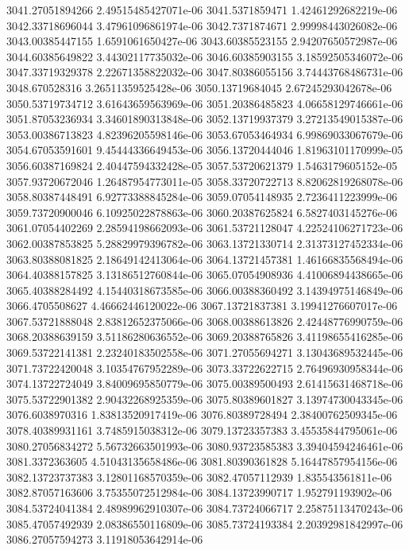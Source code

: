 {3041.27051894266 2.49515485427071e-06
3041.5371859471 1.42461292682219e-06
3042.33718696044 3.47961096861974e-06
3042.7371874671 2.99998443026082e-06
3043.00385447155 1.6591061650427e-06
3043.60385523155 2.94207650572987e-06
3044.60385649822 3.44302117735032e-06
3046.60385903155 3.18592505346072e-06
3047.33719329378 2.22671358822032e-06
3047.80386055156 3.74443768486731e-06
3048.670528316 3.26511359525428e-06
3050.13719684045 2.67245293042678e-06
3050.53719734712 3.61643659563969e-06
3051.20386485823 4.06658129746661e-06
3051.87053236934 3.34601890313848e-06
3052.13719937379 3.27213549015387e-06
3053.00386713823 4.82396205598146e-06
3053.67053464934 6.99869033067679e-06
3054.67053591601 9.45444336649453e-06
3056.13720444046 1.81963101170999e-05
3056.60387169824 2.40447594332428e-05
3057.53720621379 1.5463179605152e-05
3057.93720672046 1.26487954773011e-05
3058.33720722713 8.82062819268078e-06
3058.80387448491 6.92773388845284e-06
3059.07054148935 2.7236411223999e-06
3059.73720900046 6.10925022878863e-06
3060.20387625824 6.5827403145276e-06
3061.07054402269 2.28594198662093e-06
3061.53721128047 4.22524106271723e-06
3062.00387853825 5.28829979396782e-06
3063.13721330714 2.31373127452334e-06
3063.80388081825 2.18649142413064e-06
3064.13721457381 1.46166835568494e-06
3064.40388157825 3.13186512760844e-06
3065.07054908936 4.41006894438665e-06
3065.40388284492 4.15440318673585e-06
3066.00388360492 3.14394975146849e-06
3066.4705508627 4.46662446120022e-06
3067.13721837381 3.19941276607017e-06
3067.53721888048 2.83812652375066e-06
3068.00388613826 2.42448776990759e-06
3068.20388639159 3.51186280636552e-06
3069.20388765826 3.41198655416285e-06
3069.53722141381 2.23240183502558e-06
3071.27055694271 3.13043689532445e-06
3071.73722420048 3.10354767952289e-06
3073.33722622715 2.76496930958344e-06
3074.13722724049 3.84009695850779e-06
3075.00389500493 2.61415631468718e-06
3075.53722901382 2.90432268925359e-06
3075.80389601827 3.13974730043345e-06
3076.6038970316 1.83813520917419e-06
3076.80389728494 2.38400762509345e-06
3078.40389931161 3.7485915038312e-06
3079.13723357383 3.45535844795061e-06
3080.27056834272 5.56732663501993e-06
3080.93723585383 3.39404594246461e-06
3081.3372363605 4.51043135658486e-06
3081.80390361828 5.16447857954156e-06
3082.13723737383 3.12801168570359e-06
3082.47057112939 1.835543561811e-06
3082.87057163606 3.75355072512984e-06
3084.13723990717 1.952791193902e-06
3084.53724041384 2.48989962910307e-06
3084.73724066717 2.25875113470243e-06
3085.47057492939 2.08386550116809e-06
3085.73724193384 2.20392981842997e-06
3086.27057594273 3.11918053642914e-06
}
